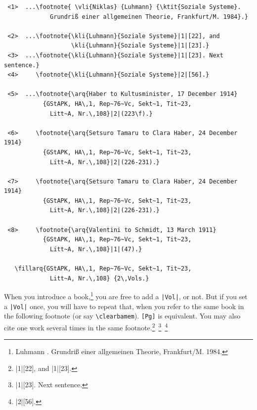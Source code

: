 \documentclass[12pt,a4paper]{article}
\renewcommand{\{}{{\normalfont\lbashortmem}}
\renewcommand{\}}{{\normalfont\rbashortmem}}
\begin{document}
\setcounter{footnote}{0}
{\footnotesize\begin{verbatim}
 <1>  ...\footnote{ \vli{Niklas} {Luhmann} {\ktit{Soziale Systeme}.
             Grundriß einer allgemeinen Theorie, Frankfurt/M. 1984}.}

 <2>  ...\footnote{\kli{Luhmann}{Soziale Systeme}|1|[22], and 
                   \kli{Luhmann}{Soziale Systeme}|1|[23].}
 <3>  ...\footnote{\kli{Luhmann}{Soziale Systeme}|1|[23]. Next sentence.}
 <4>     \footnote{\kli{Luhmann}{Soziale Systeme}|2|[56].}

 <5>  ...\footnote{\arq{Haber to Kultusminister, 17 December 1914}
           {GStAPK, HA\,1, Rep~76~Vc, Sekt~1, Tit~23, 
             Litt~A, Nr.\,108}|2|(223\f).}
                                                
 <6>     \footnote{\arq{Setsuro Tamaru to Clara Haber, 24 December 1914} 
           {GStAPK, HA\,1, Rep~76~Vc, Sekt~1, Tit~23, 
             Litt~A, Nr.\,108}|2|(226-231).}
                                                
 <7>     \footnote{\arq{Setsuro Tamaru to Clara Haber, 24 December 1914} 
           {GStAPK, HA\,1, Rep~76~Vc, Sekt~1, Tit~23, 
             Litt~A, Nr.\,108}|2|(226-231).}
                                                
 <8>     \footnote{\arq{Valentini to Schmidt, 13 March 1911} 
           {GStAPK, HA\,1, Rep~76~Vc, Sekt~1, Tit~23, 
             Litt~A, Nr.\,108}|1|(47).}
                                                
   \fillarq{GStAPK, HA\,1, Rep~76~Vc, Sekt~1, Tit~23, 
             Litt~A, Nr.\,108} {2\,Vols.}
\end{verbatim}}

  \noindent
  When you introduce a book,\footnote{  {Luhmann} {.
  Grundriß einer allgemeinen Theorie, Frankfurt/M. 1984}.}
  you are free to add a \verb+|Vol|+, or not. But if you set a \verb+|Vol|+ once,
  you will have to repeat that, when you refer to the same book in the following
  footnote (or say \verb|\clearbamem|).
  \verb+[Pg]+ is equivalent. You may also cite one work several times in the same 
  footnote.\footnote{|1|[22], and
  |1|[23].}\,%
  \footnote{|1|[23]. Next sentence.}\,%
  \footnote{|2|[56].}
\end{document}
